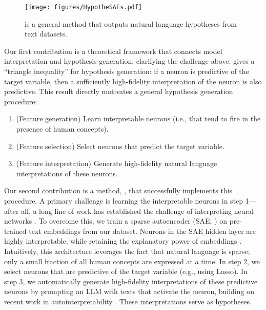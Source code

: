 \begin{figure*}
\begin{center}
    \texttt{[image: figures/HypotheSAEs.pdf]}
\end{center}
    \caption{\ourmethod is a general method that outputs natural language hypotheses from text datasets.}
\end{figure*}

Our first contribution is a theoretical framework that connects model interpretation and hypothesis generation, clarifying the challenge above.  gives a ``triangle inequality'' for hypothesis generation: if a neuron is predictive of the target variable, then a sufficiently high-fidelity interpretation of the neuron is also predictive. This result directly motivates a general hypothesis generation procedure: 
\begin{enumerate}
    \item (Feature generation) Learn interpretable neurons (i.e., that tend to fire in the presence of human concepts).
    \item (Feature selection) Select neurons that predict the target variable.
    \item (Feature interpretation) Generate high-fidelity natural language interpretations of these neurons.   
\end{enumerate}

Our second contribution is a method, \ourmethod, that successfully implements this procedure. A primary challenge is learning the interpretable neurons in step 1---after all, a long line of work has established the challenge of interpreting neural networks \citep{olah_feature_2017, kim_interpretability_2018, elhage_toy_2022}. To overcome this, we train a sparse autoencoder (SAE; \citet{makhzani_ksparse_2014}) on pre-trained text embeddings from our dataset. Neurons in the SAE hidden layer are highly interpretable, while retaining the explanatory power of embeddings \citep{cunningham2023sparse, bricken2023towards, templeton2024scaling, gao_scaling_2024, oneill_disentangling_2024}. Intuitively, this architecture leverages the fact that natural language is sparse; only a small fraction of all human concepts are expressed at a time. In step 2, we select neurons that are predictive of the target variable (e.g., using Lasso). In step 3, we automatically generate high-fidelity interpretations of these predictive neurons by prompting an LLM with texts that activate the neuron, building on recent work in autointerpretability \citep{bills2023language}. These interpretations serve as hypotheses.


